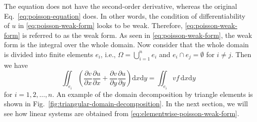 {The equation does not have the second-order derivative, whereas the original Eq.\ \eqref{eq:poisson-equation} does. In other words, the condition of differentiability of $u$ in \eqref{eq:poisson-weak-form} looks to be weak. Therefore, \eqref{eq:poisson-weak-form} is referred to as the weak form.}
{As seen in \eqref{eq:poisson-weak-form}, the weak form is the integral over the whole domain. Now consider that the whole domain is divided into finite elements $e_i$, i.e., $\Omega=\bigcup_{i=1}^n e_i$ and $e_i\cap e_j=\emptyset$ for $i\ne j$. Then we have}
\begin{equation}\label{eq:elementwise-poisson-weak-form}
\iint_{e_i}\left(\frac{\partial v}{\partial x}\frac{\partial u}{\partial x}+\frac{\partial v}{\partial y}\frac{\partial u}{\partial y}\right)\mathrm dx\mathrm dy=\iint_{e_i}vf\,\mathrm dx\mathrm dy
\end{equation}
{for $i=1,2,\ldots,n$. An example of the domain decomposition by triangle elements is shown in Fig.\ \ref{fig:triangular-domain-decomposition}. In the next section, we will see how linear systems are obtained from \eqref{eq:elementwise-poisson-weak-form}.}
